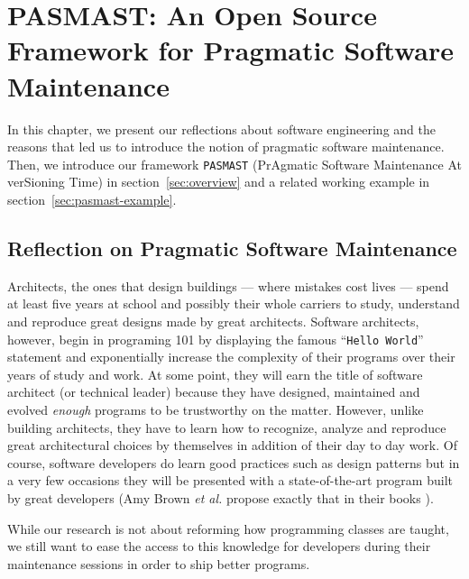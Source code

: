 
\chapter{PASMAST: An Open Source Framework for Pragmatic Software Maintenance\label{chap:pasmast}}

In this chapter, we present our reflections about software engineering and the reasons that led us to introduce the notion of pragmatic software maintenance.
Then, we introduce our framework {\tt PASMAST} (PrAgmatic Software Maintenance At verSioning Time) in section~\ref{sec:overview} and a related working example in section~\ref{sec:pasmast-example}.

\section{Reflection on Pragmatic Software Maintenance}

Architects, the ones that design buildings --- where mistakes cost lives --- spend at least five years at school and possibly their whole carriers to study, understand and reproduce great designs made by great architects.
Software architects, however, begin in programing 101 by displaying the famous ``{\tt Hello World}'' statement and exponentially increase the complexity of their programs over their years of study and work.
At some point, they will earn the title of software architect (or technical leader) because they have designed, maintained and evolved {\it enough} programs to be trustworthy on the matter.
However, unlike building architects, they have to learn how to recognize, analyze and reproduce great architectural choices by themselves in addition of their day to day work.
Of course, software developers do learn good practices such as design patterns \cite{Gamma2008} but in a very few occasions they will be presented with a state-of-the-art program built by great developers (Amy Brown {\it et al.} propose exactly that in their books \cite{chansler2011architecture, AmyBrown2012, Armstrong2013}).

While our research is not about reforming how programming classes are taught, we still want to ease the access to this knowledge for developers during their maintenance sessions in order to ship better programs.

